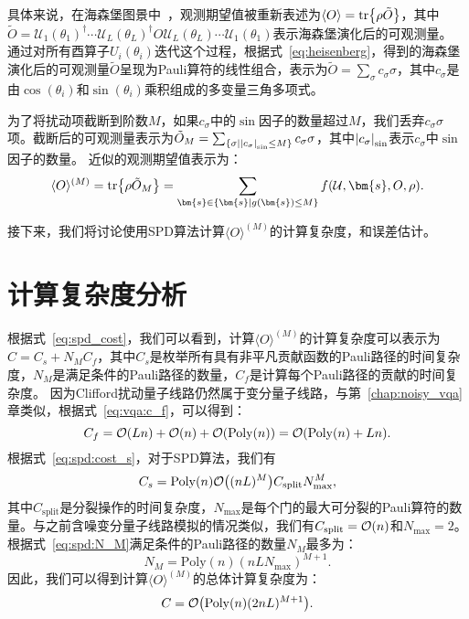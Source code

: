 具体来说，在海森堡图景中~\cite{zhang2024clifford}，观测期望值被重新表述为$\langle O \rangle = \tr{\rho \tilde{O}}$，其中$\tilde{O} = \mathcal{U}_1(\theta_1)^{\dagger} \cdots  \mathcal{U}_L(\theta_L)^{\dagger} O \mathcal{U}_L(\theta_L)  \cdots \mathcal{U}_1(\theta_1)$表示海森堡演化后的可观测量。
通过对所有酉算子$U_i(\theta_i)$迭代这个过程，根据式~\eqref{eq:heisenberg}，得到的海森堡演化后的可观测量$\tilde{O}$呈现为Pauli算符的线性组合，表示为$\tilde{O} = \sum_\sigma c_\sigma \sigma$，其中$c_\sigma$是由$\cos(\theta_i)$和$\sin(\theta_i)$乘积组成的多变量三角多项式。

为了将扰动项截断到阶数$M$，如果$c_\sigma$中的$\sin$因子的数量超过$M$，我们丢弃$c_\sigma \sigma$项。截断后的可观测量表示为$\tilde{O}_M=\sum_{\{\sigma\mid \abs{c_\sigma}_{\sin}\leq M\}} c_\sigma \sigma$，其中$\abs{c_\sigma}_{\sin}$表示$c_\sigma$中$\sin$因子的数量。
近似的观测期望值表示为：
\begin{equation}\label{eq:sim_noiseless}
  \langle O \rangle ^{(M)}= \tr{\rho \tilde{O}_M}= \sum_{\bm{s}\in \{\bm{s}\mid g(\bm{s})\leq M\}} f(\mathcal{U},\bm{s},O,\rho).
\end{equation}

接下来，我们将讨论使用SPD算法计算$\langle O \rangle ^{(M)}$的计算复杂度，和误差估计。

\section{计算复杂度分析}
根据式~\eqref{eq:spd_cost}，我们可以看到，计算$\langle O \rangle ^{(M)}$的计算复杂度可以表示为$C = C_s+N_MC_f$，其中$C_s$是枚举所有具有非平凡贡献函数的Pauli路径的时间复杂度，$N_M$是满足条件的Pauli路径的数量，$C_f$是计算每个Pauli路径的贡献的时间复杂度。
因为Clifford扰动量子线路仍然属于变分量子线路，与第~\ref{chap:noisy_vqa}章类似，根据式~\eqref{eq:vqa:c_f}，可以得到：
\begin{equation}
    C_f=\order{L n}+\order{n}+\order{\poly(n)}=\order{\poly(n)+L n}.
\end{equation}
根据式~\eqref{eq:spd:cost_s}，对于SPD算法，我们有
\begin{equation}
    C_s=\mathrm{Poly}(n) \order{(nL)^{M}} C_{\text{split}} N_{\text{max}}^{M},
\end{equation}
其中$C_{\text{split}}$是分裂操作的时间复杂度，$N_{\text{max}}$是每个门的最大可分裂的Pauli算符的数量。与之前含噪变分量子线路模拟的情况类似，我们有$C_{\text{split}}=\order{n}$和$N_{\text{max}}=2$。
根据式~\eqref{eq:spd:N_M}满足条件的Pauli路径的数量$N_M$最多为：
\begin{equation}
    N_M=\mathrm{Poly}(n) (nLN_{\text{max}})^{M+1}.
\end{equation}
因此，我们可以得到计算$\langle O \rangle ^{(M)}$的总体计算复杂度为：
\begin{equation}
    C=\order{\mathrm{Poly}(n) (2nL)^{M+1}}.
\end{equation}

